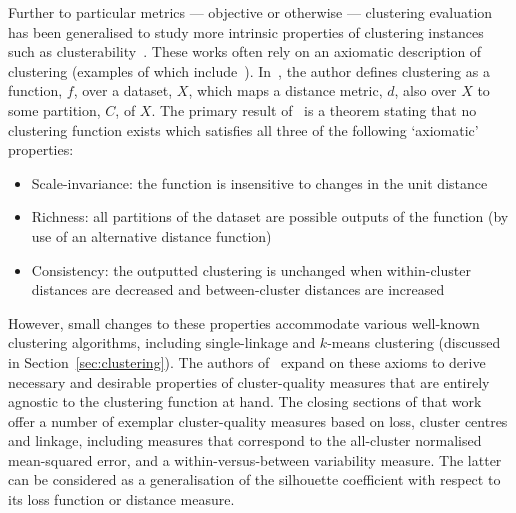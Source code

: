 Further to particular metrics --- objective or otherwise --- clustering
evaluation has been generalised to study more intrinsic properties of clustering
instances such as clusterability~\cite{Ackerman2009,Ostrovsky2006,Zhang2001}.
These works often rely on an axiomatic description of clustering (examples of
which include~\cite{Bezdek1978,Jardine1971,Kleinberg2002}).
In~\cite{Kleinberg2002}, the author defines clustering as a function, \(f\),
over a dataset, \(X\), which maps a distance metric, \(d\), also over \(X\) to
some partition, \(C\), of \(X\).
The primary result of~\cite{Kleinberg2002} is a theorem
stating that no clustering function exists which satisfies all three of the
following `axiomatic' properties:

\begin{itemize}
    \item Scale-invariance: the function is insensitive to changes in the unit
        distance
    \item Richness: all partitions of the dataset are possible outputs of the
        function (by use of an alternative distance function)
    \item Consistency: the outputted clustering is unchanged when within-cluster
        distances are decreased and between-cluster distances are increased
\end{itemize}

However, small changes to these properties accommodate various well-known
clustering algorithms, including single-linkage and \(k\)-means clustering
(discussed in Section~\ref{sec:clustering}). The authors
of~\cite{BenDavid2008} expand on these axioms to derive necessary and desirable
properties of cluster-quality measures that are entirely agnostic to the
clustering function at hand. The closing sections of that work offer a number of
exemplar cluster-quality measures based on loss, cluster centres and linkage,
including measures that correspond to the all-cluster normalised mean-squared
error, and a within-versus-between variability measure. The latter can be
considered as a generalisation of the silhouette coefficient with respect to its
loss function or distance measure.

